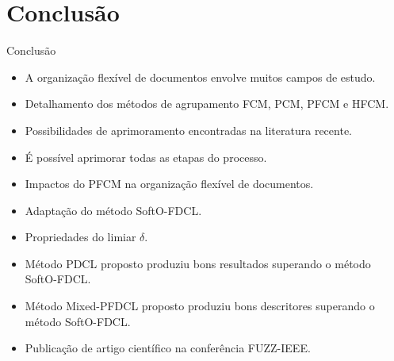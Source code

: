 \documentclass[brazil]{beamer}
\begin{document}
\section{Conclusão}

\begin{frame}{Conclusão}
  \begin{itemize}
    \item<1 -> A organização flexível de documentos envolve muitos campos de estudo.
    \item<2 -> Detalhamento dos métodos de agrupamento FCM, PCM, PFCM e HFCM.
    \item<3 -> Possibilidades de aprimoramento encontradas na literatura recente.
    \item<4 -> É possível aprimorar todas as etapas do processo.
    \item<5 -> Impactos do PFCM na organização flexível de documentos.
    \item<6 -> Adaptação do método SoftO-FDCL.
    \item<7 -> Propriedades do limiar $\delta$.
    \item<8 -> Método PDCL proposto produziu bons resultados superando o método SoftO-FDCL.
    \item<9 -> Método Mixed-PFDCL proposto produziu bons descritores superando o método SoftO-FDCL.
    \item<10 -> Publicação de artigo científico na conferência FUZZ-IEEE.
  \end{itemize}
\end{frame}

%
\end{document}
